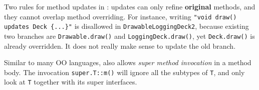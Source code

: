 Two rules for method updates in \MIM: updates can only refine \textbf{original} methods, and they cannot overlap method overriding. For instance, writing \lstinline|"void draw()| \lstinline|updates Deck {...}"| is disallowed in \lstinline|DrawableLoggingDeck2|, because existing two branches are \lstinline|Drawable.draw()| and \lstinline|LoggingDeck.draw()|, yet \lstinline|Deck.draw()| is already overridden. It does not really make sense to update the old branch.

Similar to many OO languages, \MIM{} also allows \textit{super method invocation} in a method body. The invocation \lstinline|super.T::m()| will ignore all the subtypes of \lstinline|T|, and only look at \lstinline|T| together with its super interfaces.